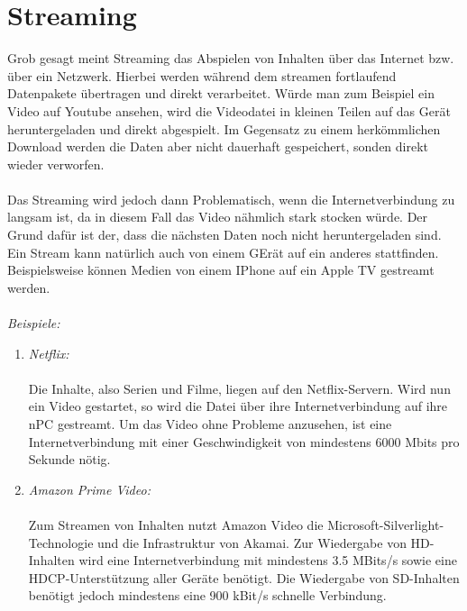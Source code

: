 \documentclass[11pt]{article}
\begin{document}
    \section{Streaming}

    Grob gesagt meint Streaming das Abspielen von Inhalten über das Internet bzw. über ein Netzwerk.
    Hierbei werden während dem streamen fortlaufend Datenpakete übertragen und direkt verarbeitet.
    Würde man zum Beispiel ein Video auf Youtube ansehen, wird die Videodatei in kleinen Teilen auf das
    Gerät heruntergeladen und direkt abgespielt. Im Gegensatz zu einem herkömmlichen Download werden die
    Daten aber nicht dauerhaft gespeichert, sonden direkt wieder verworfen.
    \\\\Das Streaming wird jedoch dann Problematisch, wenn die Internetverbindung zu langsam ist, da in diesem
    Fall das Video nähmlich stark stocken würde. Der Grund dafür ist der, dass die nächsten Daten noch nicht
    heruntergeladen sind.
    Ein Stream kann natürlich auch von einem GErät auf ein anderes stattfinden. Beispielsweise können Medien von einem
    IPhone auf ein Apple TV gestreamt werden.\\\\

    \emph{Beispiele:}\\

    \begin{addmargin}[1em]{1em}

        \begin{enumerate}

            \item \emph{Netflix:}\\\\ Die Inhalte, also Serien und Filme, liegen auf den Netflix-Servern. Wird nun ein Video
            gestartet, so wird die Datei über ihre Internetverbindung auf ihre nPC gestreamt. Um das Video ohne Probleme
            anzusehen, ist eine Internetverbindung mit einer Geschwindigkeit von mindestens 6000 Mbits pro Sekunde nötig.\\

            \item \emph{Amazon Prime Video:}\\\\ Zum Streamen von Inhalten nutzt Amazon Video die Microsoft-Silverlight-Technologie
            und die Infrastruktur von Akamai. Zur Wiedergabe von HD-Inhalten wird eine Internetverbindung mit mindestens 3.5 MBits/s
            sowie eine HDCP-Unterstützung aller Geräte benötigt. Die Wiedergabe von SD-Inhalten benötigt jedoch mindestens eine 900 kBit/s
            schnelle Verbindung.

        \end{enumerate}
    \end{addmargin}
\end{document}
